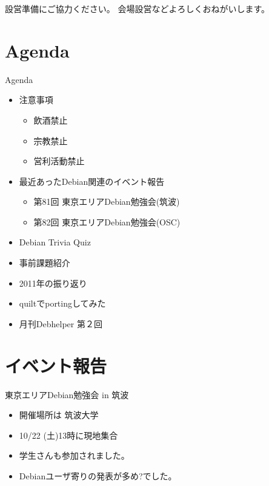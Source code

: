 \frame{\titlepage{}}


\begin{frame}{設営準備にご協力ください。}
会場設営などよろしくおねがいします。
\end{frame}


\section{Agenda}
\begin{frame}{Agenda}
\begin{minipage}[t]{0.45\hsize}
  \begin{itemize}
  \item 注意事項
	\begin{itemize}
	 \item 飲酒禁止
	 \item 宗教禁止
	 \item 営利活動禁止
	\end{itemize}
   \item 最近あったDebian関連のイベント報告
	\begin{itemize}
        \item 第81回 東京エリアDebian勉強会(筑波)
        \item 第82回 東京エリアDebian勉強会(OSC)
	\end{itemize}
 \end{itemize}
\end{minipage} 
\begin{minipage}[t]{0.45\hsize}
 \begin{itemize}
   \item Debian Trivia Quiz
   \item 事前課題紹介
   \item 2011年の振り返り
   \item quiltでportingしてみた
   \item 月刊Debhelper 第２回
  \end{itemize}
\end{minipage}
\end{frame}

\section{イベント報告}

\begin{frame}{東京エリアDebian勉強会 in 筑波}
\begin{itemize}
\item 開催場所は 筑波大学
\item 10/22 (土)13時に現地集合
\item 学生さんも参加されました。
\item Debianユーザ寄りの発表が多め?でした。
\end{itemize}
\end{frame}

